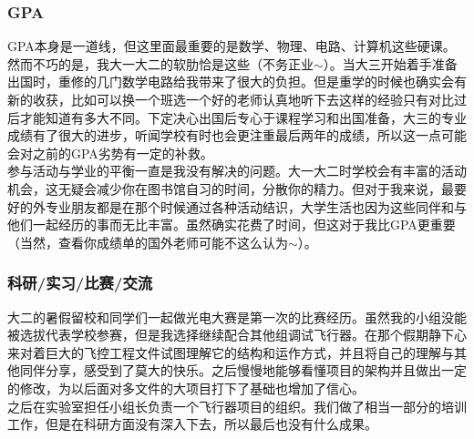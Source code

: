 \documentclass[a4paper,UTF8]{book}
\begin{document}
        \subsubsection*{GPA}
        GPA本身是一道线，但这里面最重要的是数学、物理、电路、计算机这些硬课。然而不巧的是，我大一大二的软肋恰是这些（不务正业$\sim$）。当大三开始着手准备出国时，重修的几门数学电路给我带来了很大的负担。但是重学的时候也确实会有新的收获，比如可以换一个班选一个好的老师认真地听下去这样的经验只有对比过后才能知道有多大不同。下定决心出国后专心于课程学习和出国准备，大三的专业成绩有了很大的进步，听闻学校有时也会更注重最后两年的成绩，所以这一点可能会对之前的GPA劣势有一定的补救。\\
        参与活动与学业的平衡一直是我没有解决的问题。大一大二时学校会有丰富的活动机会，这无疑会减少你在图书馆自习的时间，分散你的精力。但对于我来说，最要好的外专业朋友都是在那个时候通过各种活动结识，大学生活也因为这些同伴和与他们一起经历的事而无比丰富。虽然确实花费了时间，但这对于我比GPA更重要（当然，查看你成绩单的国外老师可能不这么认为$\sim$）。

        \subsubsection*{科研/实习/比赛/交流}
        大二的暑假留校和同学们一起做光电大赛是第一次的比赛经历。虽然我的小组没能被选拔代表学校参赛，但是我选择继续配合其他组调试飞行器。在那个假期静下心来对着巨大的飞控工程文件试图理解它的结构和运作方式，并且将自己的理解与其他同伴分享，感受到了莫大的快乐。之后慢慢地能够看懂项目的架构并且做出一定的修改，为以后面对多文件的大项目打下了基础也增加了信心。\\
        之后在实验室担任小组长负责一个飞行器项目的组织。我们做了相当一部分的培训工作，但是在科研方面没有深入下去，所以最后也没有什么成果。
\end{document}
